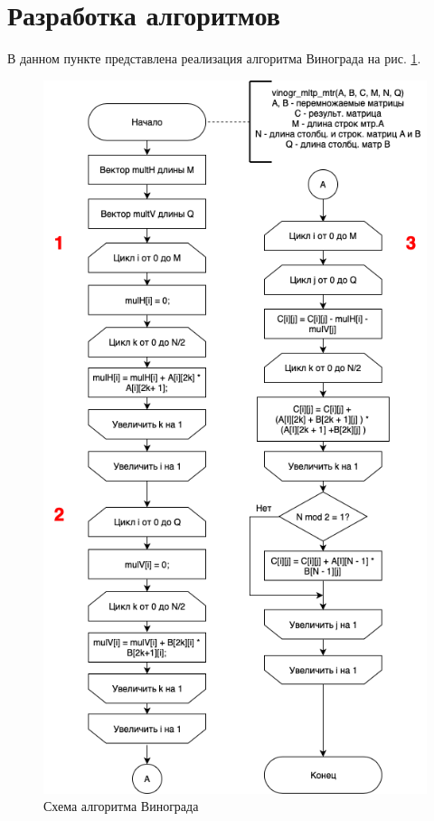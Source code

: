 \documentclass[12pt, a4paper]{report}
\begin{document}
	\section{Разработка алгоритмов}
	
	\hspace{0.6cm}В данном пункте представлена реализация алгоритма Винограда на рис. \ref{scheme}. 
	
	\newpage
	
	\begin{figure}[ht!]
		\label{scheme}
		\centering
		\includegraphics[scale=0.7]{scheme.png}
		\caption{Схема алгоритма Винограда}
	\end{figure}
\end{document}
